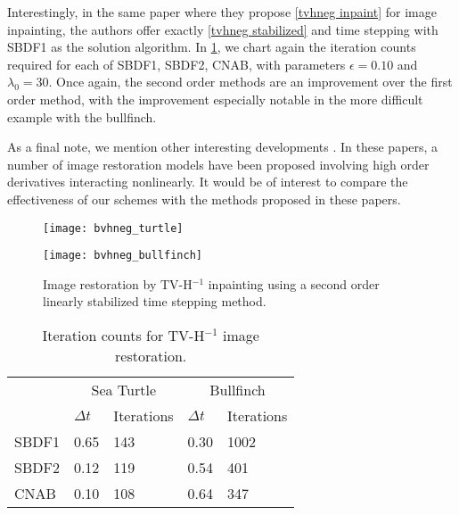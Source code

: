 Interestingly, in the same paper where they propose \cref{tvhneg inpaint} for image inpainting, the authors offer exactly \cref{tvhneg stabilized} and time stepping with SBDF1 as the solution algorithm. In \cref{tab:bvhneg iter counts}, we chart again the iteration counts required for each of SBDF1, SBDF2, CNAB, with parameters $\epsilon=0.10$ and $\lambda_0=30$. Once again, the second order methods are an improvement over the first order method, with the improvement especially notable in the more difficult example with the bullfinch. 

As a final note, we mention other interesting developments \cite{bredies2010total,papafitsoros2014combined,papafitsoros2013combined}. In these papers, a number of image restoration models have been proposed involving high order derivatives interacting nonlinearly. It would be of interest to compare the effectiveness of our schemes with the methods proposed in these papers.

\begin{figure}[htb!]
	\centering
\begin{minipage}{0.65\textwidth}
	\texttt{[image: bvhneg\_turtle]}
\end{minipage}
\begin{minipage}{0.65\textwidth}
	\texttt{[image: bvhneg\_bullfinch]}
\end{minipage}
\caption[Image restoration by TV-H$^{-1}$ inpainting.]{Image restoration by TV-H$^{-1}$ inpainting using a second order linearly stabilized time stepping method.}
\label{fig:bvhneg inpainting}
\end{figure}

\begin{table}[htb!]
\caption[Iteration counts for TV-H$^{-1}$ image restoration.]{Iteration counts for TV-H$^{-1}$ image restoration.}
        \centering\begin{tabular}{lll ll} \toprule[1.25pt]
& \multicolumn{2}{c}{Sea Turtle} & \multicolumn{2}{c}{Bullfinch}
\\
& $\Delta t$ & Iterations & $\Delta t$ & Iterations
\\ \midrule
SBDF1 & 0.65 & 143 & 0.30 & 1002
\\
SBDF2& 0.12 & 119 & 0.54 & 401 
\\             
CNAB & 0.10 & 108 & 0.64 & 347
\\ \bottomrule[1.25pt]
\end{tabular}
\label{tab:bvhneg iter counts}
\end{table}


